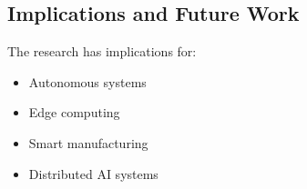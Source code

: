 \subsection{Implications and Future Work}
The research has implications for:
\begin{itemize}
    \item Autonomous systems
    \item Edge computing
    \item Smart manufacturing
    \item Distributed AI systems
\end{itemize} 